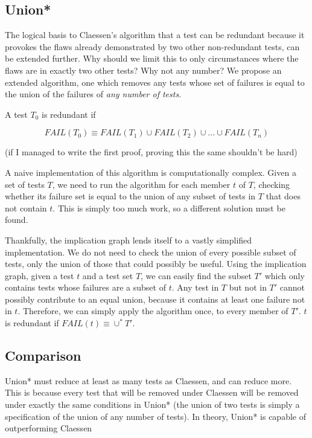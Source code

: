 \documentclass[11pt,twoside]{article}
\newcommand\fail{\mathit{FAIL}}
\let\cite=\citep
\begin{document}
\subsection{Union*}
The logical basis to Claessen's algorithm that a test can be redundant because it provokes the flaws already demonstrated by two other non-redundant tests\cite{Claessen}, can be extended further. Why should we limit this to only circumstances where the flaws are in exactly two other tests? Why not any number? We propose an extended algorithm, one which removes any tests whose set of failures is equal to the union of the failures of \emph{any number of tests}. 

A test $T_0$ is redundant if

$$\fail (T_0) \equiv \fail(T_1) \cup \fail(T_2) \cup ... \cup \fail(T_n) $$

(if I managed to write the first proof, proving this the same shouldn't be hard)

A naive implementation of this algorithm is computationally complex. Given a set of tests $T$, we need to run the algorithm for each member $t$ of $T$, checking whether its failure set is equal to the union of any subset of tests in $T$ that does not contain $t$. This is simply too much work, so a different solution must be found.

Thankfully, the implication graph lends itself to a vastly simplified implementation. We do not need to check the union of every possible subset of tests, only the union of those that could possibly be useful. Using the implication graph, given a test $t$ and a test set $T$, we can easily find the subset $T'$ which only contains tests whose failures are a subset of $t$. Any test in $T$ but not in $T'$ cannot possibly contribute to an equal union, because it contains at least one failure not in $t$. Therefore, we can simply apply the algorithm once, to every member of $T'$. $t$ is redundant if $\fail(t) \equiv \cup^* T'$.

\subsection{Comparison}
Union* must reduce at least as many tests as Claessen, and can reduce more. This is because every test that will be removed under Claessen will be removed under exactly the same conditions in Union* (the union of two tests is simply a specification of the union of any number of tests). In theory, Union* is capable of outperforming Claessen
\end{document}

